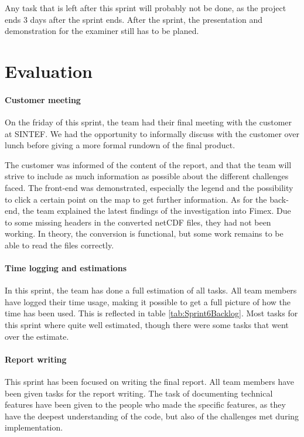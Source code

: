 \documentclass[11pt,a4paper,titlepage,oneside]{report}
\begin{document}
Any task that is left after this sprint will probably not be done, as the project ends 3 days after the sprint ends. After the sprint, the presentation and demonstration for the examiner still has to be planed. 

\section{Evaluation}
\paragraph{Customer meeting}
On the friday of this sprint, the team had their final meeting with the customer at SINTEF. We had the opportunity to informally discuss with the customer over lunch before giving a more formal rundown of the final product. 

The customer was informed of the content of the report, and that the team will strive to include as much information as possible about the different challenges faced. The \gls{front-end} was demonstrated, especially the legend and the possibility to click a certain point on the map to get further information. As for the \gls{back-end}, the team explained the latest findings of the investigation into \gls{Fimex}. Due to some missing headers in the converted netCDF files, they had not been working. In theory, the conversion is functional, but some work remains to be able to read the files correctly.

\paragraph{Time logging and estimations}
In this sprint, the team has done a full estimation of all tasks. All team members have logged their time usage, making it possible to get a full picture of how the time has been used. This is reflected in table \ref{tab:Sprint6Backlog}. Most tasks for this sprint where quite well estimated, though there were some tasks that went over the estimate.

\paragraph{Report writing}
This sprint has been focused on writing the final report. All team members have been given tasks for the report writing. The task of documenting technical features have been given to the people who made the specific features, as they have the deepest understanding of the code, but also of the challenges met during implementation. 
\end{document}
